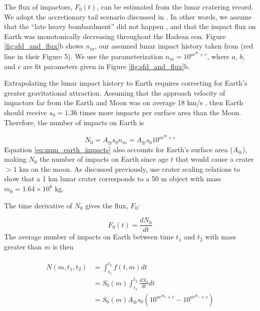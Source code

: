 \documentclass[manuscript]{aastex63}
\begin{document}
The flux of impactors, $F_0(t)$, can be estimated from the lunar cratering record. We adopt the accretionary tail scenario discussed in \citet{Morbidelli_2018}. In other words, we assume that the ``late heavy bombardment'' did not happen \citep{Cartwright_2022,Hartmann_2019,Zellner_2017}, and that the impact flux on Earth was monotonically decreasing throughout the Hadean eon. Figure \ref{fig:sfd_and_flux}b shows $n_m$, our assumed lunar impact history taken from \citet{Morbidelli_2018} (red line in their Figure 5). We use the parameterization $n_m = 10^{a e^{b t} + c}$, where $a$, $b$, and $c$ are fit parameters given in Figure \ref{fig:sfd_and_flux}b.

Extrapolating the lunar impact history to Earth requires correcting for Earth's greater gravitational attraction. Assuming that the approach velocity of impactors far from the Earth and Moon was on average 18 km/s \citep{Morbidelli_2018}, then Earth should receive $s_0 = 1.36$ times more impacts per surface area than the Moon. Therefore, the number of impacts on Earth is

\begin{equation}
  N_0 = A_\oplus s_0 n_m = A_\oplus s_0 10^{a e^{b t} + c}
  \label{eq:num_earth_impacts}
\end{equation}
Equation \eqref{eq:num_earth_impacts} also accounts for Earth's surface area ($A_\oplus$), making $N_0$ the number of impacts on Earth since age $t$ that would cause a crater $> 1$ km on the moon. As discussed previously, \citet{Morbidelli_2018} use crater scaling relations to show that a 1 km lunar crater corresponds to a 50 m object with mass $m_0 = 1.64 \times 10^8$ kg.

The time derivative of $N_0$ gives the flux, $F_0$:

\begin{equation}
  F_0(t) = \frac{d N_0}{dt}
\end{equation}
The average number of impacts on Earth between time $t_1$ and $t_2$ with mass greater than $m$ is then

\begin{align}
\begin{split}
  N(m,t_1,t_2) &= \int_{t_1}^{t_2} f(t,m) dt \\
  &= S_0(m) \int_{t_1}^{t_2} \frac{d N_0}{dt} dt \\
  &= S_0(m) A_\oplus s_0 \left( 10^{a e^{b t_2} + c} - 10^{a e^{b t_1} + c} \right)
\end{split}
\end{align}
\end{document}
